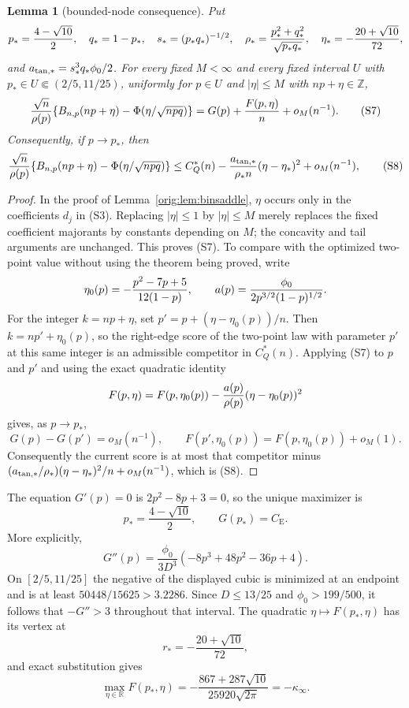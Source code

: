 \documentclass[11pt,a4paper]{article}
\numberwithin{equation}{section}
\newtheorem{lemma}[theorem]{Lemma}
\theoremstyle{definition}
\theoremstyle{remark}
\newcommand{\R}{\mathbb R}
\newcommand{\CE}{C_{\mathrm E}}
\begin{document}
\begin{lemma}[bounded-node consequence]\label{orig:lem:boundednode}
Put
\[
 p_*={4-\sqrt{10}\over2},\quad q_*=1-p_*,\quad
 s_*=(p_*q_*)^{-1/2},\quad
 \rho_*={p_*^2+q_*^2\over\sqrt{p_*q_*}},\quad
 \eta_*=-{20+\sqrt{10}\over72},
\]
and $a_{\rm tan,*}=s_*^3q_*\phi_0/2$.
For every fixed $M<\infty$ and every fixed interval
$U$ with $p_*\in U\Subset(2/5,11/25)$, uniformly for
$p\in U$ and $|\eta|\le M$ with $np+\eta\in\mathbb Z$,
\[
 {\sqrt n\over\rho(p)}
 \{B_{n,p}(np+\eta)-\Phi(\eta/\sqrt{npq})\}
 =G(p)+{F(p,\eta)\over n}+o_M(n^{-1}).                \tag{S7}
\]
Consequently, if $p\to p_*$, then
\[
 {\sqrt n\over\rho(p)}
 \{B_{n,p}(np+\eta)-\Phi(\eta/\sqrt{npq})\}
 \le C_Q^*(n)-{a_{\rm tan,*}\over\rho_*n}
             (\eta-\eta_*)^2+o_M(n^{-1}),             \tag{S8}
\]
\end{lemma}

\begin{proof}
In the proof of Lemma~\ref{orig:lem:binsaddle}, $\eta$ occurs only in the
coefficients $d_j$ in (S3).  Replacing $|\eta|\le1$ by $|\eta|\le M$
merely replaces the fixed coefficient majorants by constants depending on
$M$; the concavity and tail arguments are unchanged.  This proves (S7).
To compare with the optimized two-point value without using the theorem
being proved, write
\[
 \eta_0(p)=-{p^2-7p+5\over12(1-p)},\qquad
 a(p)={\phi_0\over2p^{3/2}(1-p)^{1/2}}.
\]
For the integer $k=np+\eta$, set
$p'=p+(\eta-\eta_0(p))/n$.  Then
$k=np'+\eta_0(p)$, so the right-edge score of the two-point law with
parameter $p'$ at this same integer is an admissible competitor in
$C_Q^*(n)$.  Applying (S7) to $p$ and $p'$ and using the exact quadratic
identity
\[
 F(p,\eta)=F(p,\eta_0(p))
       -{a(p)\over\rho(p)}(\eta-\eta_0(p))^2
\]
gives, as $p\to p_*$,
\[
 G(p)-G(p')=o_M(n^{-1}),\qquad
 F(p',\eta_0(p))=F(p,\eta_0(p))+o_M(1).
\]
Consequently the current score is at most that competitor minus
$(a_{\rm tan,*}/\rho_*)
(\eta-\eta_*)^2/n+o_M(n^{-1})$, which is (S8).
\end{proof}

The equation $G'(p)=0$ is $2p^2-8p+3=0$, so the unique maximizer is
\[
 p_*=\frac{4-\sqrt{10}}2,
 \qquad G(p_*)=\CE.
\]
More explicitly,
\[
 G''(p)=\frac{\phi_0}{3D^3}
 (-8p^3+48p^2-36p+4).
\]
On $[2/5,11/25]$ the negative of the displayed cubic is minimized at an
endpoint and is at least $50448/15625>3.2286$.  Since $D\le13/25$ and
$\phi_0>199/500$, it follows that $-G''>3$ throughout that interval.
The quadratic $\eta\mapsto F(p_*,\eta)$ has its vertex at
\[
 r_*=-\frac{20+\sqrt{10}}{72},
\]
and exact substitution gives
\[
 \max_{\eta\in\R}F(p_*,\eta)
 =-\frac{867+287\sqrt{10}}{25920\sqrt{2\pi}}
 =-\kappa_\infty.
\]
\end{document}
